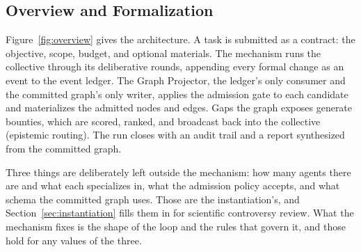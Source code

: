 \subsection{Overview and Formalization}

Figure~\ref{fig:overview} gives the architecture. A task is submitted as a
contract: the objective, scope, budget, and optional materials. The mechanism
runs the collective through its deliberative rounds, appending every formal
change as an event to the event ledger. The Graph Projector, the ledger's only
consumer and the committed graph's only writer, applies the admission gate to
each candidate and materializes the admitted nodes and edges. Gaps the graph
exposes generate bounties, which are scored, ranked, and broadcast back into
the collective (epistemic routing). The run closes with an audit trail and a
report synthesized from the committed graph.

Three things are deliberately left outside the mechanism: how many agents
there are and what each specializes in, what the admission policy accepts, and
what schema the committed graph uses. Those are the instantiation's, and
Section~\ref{sec:instantiation} fills them in for scientific controversy
review. What the mechanism fixes is the shape of the loop and the rules that
govern it, and those hold for any values of the three.


